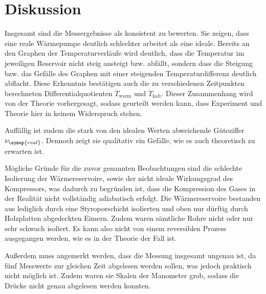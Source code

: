 \section{Diskussion}
\label{sec:Diskussion}

Insgesamt sind die Messergebnisse als konsistent zu bewerten. Sie zeigen, dass eine
reale Wärmepumpe deutlich schlechter arbeitet als eine ideale.
Bereits an den Graphen der Temperaturverläufe wird deutlich, dass die Temperatur
im jeweiligen Reservoir nicht steig ansteigt bzw. abfällt, sondern dass die
Steigung bzw. das Gefälle des Graphen mit einer steigenden Temperaturdifferenz
deutlich abflacht. Diese Erkenntnis bestätigen auch die zu verschiedenen Zeitpunkten
berechneten Differentialquotienten $\dot{T}_\text{warm}$ und $\dot{T}_\text{kalt}$.
Dieser Zusammenhang wird von der Theorie vorhergesagt, sodass geurteilt werden kann,
dass Experiment und Theorie hier in keinem Widerspruch stehen.

Auffällig ist zudem die stark von den idealen Werten abweichende Güteziffer $\nu_{\symup{real}}$.
Dennoch zeigt sie qualitativ ein Gefälle, wie es auch theoretisch zu erwarten ist.

Mögliche Gründe für die zuvor genannten Beobachtungen sind die schlechte Isolierung der Wärmereservoire, sowie
der nicht ideale Wirkungsgrad des Kompressors, was dadurch zu begründen ist, dass die Kompression des Gases
in der Realität nicht vollständig adiabatisch erfolgt. Die Wärmereservoire bestanden
aus lediglich durch eine Styroporschicht isolierten und oben nur dürftig durch Holzplatten
abgedeckten Eimern. Zudem waren sämtliche Rohre nicht oder nur sehr schwach isoliert.
Es kann also nicht von einem reversiblen Prozess ausgegangen werden, wie es in der
Theorie der Fall ist.

Außerdem muss angemerkt werden, dass die Messung insgesamt ungenau ist, da fünf Messwerte
zur gleichen Zeit abgelesen werden sollen, was jedoch praktisch nicht möglich ist.
Zudem waren sie Skalen der Manometer grob, sodass die Drücke nicht genau abgelesen
werden konnten.
